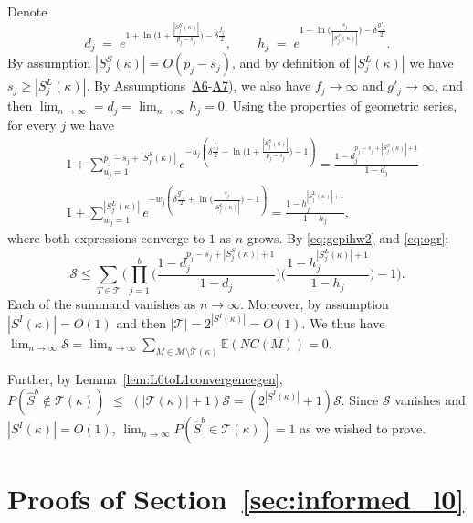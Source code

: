 \documentclass[bj,authoryear]{imsart}
\theoremstyle{plain}
\newcommand{\E}{\mathbb{E}}
\newcommand{\M}{\mathcal{M}}
\newcommand{\T}{\mathcal{T}}
\begin{document}
Denote
$$
d_j\;=\;e^{1+\ln\big(1+\frac{|S^{S}_j(\kappa)|}{p_j-s_j}\big)-\delta \tfrac{f_j}{2}},\qquad h_j\;=\;e^{1-\ln\big(\frac{s_j}{|S_j^{L}(\kappa)|}\big)-\delta \tfrac{g'_j}{2}}.
$$
By assumption $|S^{S}_j(\kappa)|=O(p_j-s_j)$, and by definition of $|S_j^{L}(\kappa)|$ we have $s_j\geq|S_j^{L}(\kappa)|$. By Assumptions~\hyperlink{lab:A6}{A6}-\hyperlink{lab:A7}{A7}), we also have $f_j\to\infty$ and $g'_j\to\infty$, and then $\lim_{n \to \infty}= d_j= \lim_{n \to \infty} h_j=0$. Using the properties of geometric series, 
 for every $j$ we have
\begin{eqnarray*}
    &1+\sum_{u_j=1}^{p_j-s_j+|S_j^{S}(\kappa)|}e^{-u_j\left(\delta \tfrac{f_j}{2}-\ln\big(1+\frac{|S^{S}_j(\kappa)|}{p_j-s_j}\big)-1\right)}
    =\frac{1-d_j^{p_j-s_j+|S_j^{S}(\kappa)|+1}}{1-d_j} \\
    &1+\sum_{w_j=1}^{|S_j^{L}(\kappa)|}    e^{-w_j\left(\delta \tfrac{g'_j}{2}+\ln\big(\frac{s_j}{|S_j^{L}(\kappa)|}\big)-1\right)} =\frac{1-h_j^{|S_j^{L}(\kappa)|+1}}{1-h_j},
\end{eqnarray*}
where both expressions converge to $1$ as $n$ grows. By \eqref{eq:gepihw2} and \eqref{eq:ogr}:
$$\mathcal{S}\leq\sum_{T\in\T}\Bigg(\prod_{j=1}^b\Big(\frac{1-d_j^{p_j-s_j+|S_j^{S}(\kappa)|+1}}{1-d_j}\Big)\Big(\frac{1-h_j^{|S_j^{L}(\kappa)|+1}}{1-h_j}\Big)-1\Bigg).$$
Each of the summand vanishes as $n\to\infty$. Moreover, by assumption $|S^I(\kappa)|=O(1)$ and then $|\T|=2^{|S^I(\kappa)|}=O(1)$. We thus have $\lim_{n\to\infty}\mathcal{S}=\lim_{n\to\infty}\sum_{M \in \M\setminus \T(\kappa)} \E\left(NC(M)\right)=0$.

Further, by Lemma~\ref{lem:L0toL1convergencegen}, 
$P(\hat{S}^{b} \not\in \T(\kappa) ) \,\,\leq \,\, (|\T(\kappa)|+1) \mathcal{S} = (2^{|S^{I}(\kappa)|}+1) \mathcal{S}$. Since $\mathcal{S}$ vanishes and $|S^{I}(\kappa)|=O(1)$, $\lim_{n\to\infty}P(\hat{S}^{b} \in \T(\kappa) )=1$ as we wished to prove.


\section{Proofs of Section~\ref{sec:informed_l0}}\label{suppsec:proofsempbayes}
\end{document}

